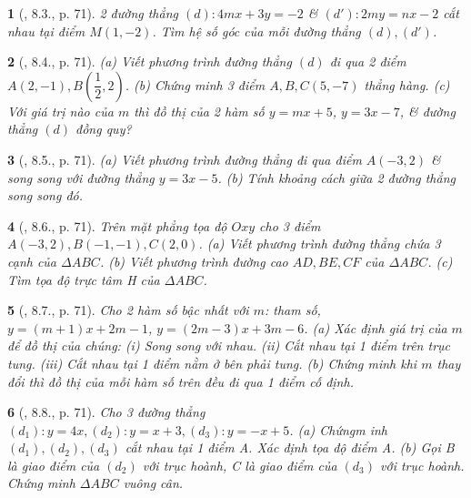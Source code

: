 \documentclass{article}
\newtheorem{baitoan}{}
\begin{document}
\begin{baitoan}[\cite{Binh_boi_duong_Toan_9_tap_1}, 8.3., p. 71]
	2 đường thẳng $(d):4mx + 3y = -2$ \& $(d'):2my = nx - 2$ cắt nhau tại điểm $M(1,-2)$. Tìm hệ số góc của mỗi đường thẳng $(d),(d')$.
\end{baitoan}

\begin{baitoan}[\cite{Binh_boi_duong_Toan_9_tap_1}, 8.4., p. 71]
	(a) Viết phương trình đường thẳng $(d)$ đi qua 2 điểm $A(2,-1),B\left(\dfrac{1}{2},2\right)$. (b) Chứng minh 3 điểm $A,B,C(5,-7)$ thẳng hàng. (c) Với giá trị nào của $m$ thì đồ thị của 2 hàm số $y = mx + 5$, $y = 3x - 7$, \& đường thẳng $(d)$ đồng quy?
\end{baitoan}

\begin{baitoan}[\cite{Binh_boi_duong_Toan_9_tap_1}, 8.5., p. 71]
	(a) Viết phương trình đường thẳng đi qua điểm $A(-3,2)$ \& song song với đường thẳng $y = 3x - 5$. (b) Tính khoảng cách giữa 2 đường thẳng song song đó.
\end{baitoan}

\begin{baitoan}[\cite{Binh_boi_duong_Toan_9_tap_1}, 8.6., p. 71]
	Trên mặt phẳng tọa độ $Oxy$ cho 3 điểm $A(-3,2),B(-1,-1),C(2,0)$. (a) Viết phương trình đường thẳng chứa 3 cạnh của $\Delta ABC$. (b) Viết phương trình đường cao $AD,BE,CF$ của $\Delta ABC$. (c) Tìm tọa độ trực tâm H của $\Delta ABC$.
\end{baitoan}

\begin{baitoan}[\cite{Binh_boi_duong_Toan_9_tap_1}, 8.7., p. 71]
	Cho 2 hàm số bậc nhất với $m$: tham số, $y = (m + 1)x + 2m - 1$, $y = (2m - 3)x + 3m - 6$. (a) Xác định giá trị của $m$ để đồ thị của chúng: (i) Song song với nhau. (ii) Cắt nhau tại 1 điểm trên trục tung. (iii) Cắt nhau tại 1 điểm nằm ở bên phải tung. (b) Chứng minh khi $m$ thay đổi thì đồ thị của mỗi hàm số trên đều đi qua 1 điểm cố định.
\end{baitoan}

\begin{baitoan}[\cite{Binh_boi_duong_Toan_9_tap_1}, 8.8., p. 71]
	Cho 3 đường thẳng $(d_1):y = 4x,(d_2):y = x + 3,(d_3):y = -x + 5$. (a) Chứngm inh $(d_1),(d_2),(d_3)$ cắt nhau tại 1 điểm A. Xác định tọa độ điểm A. (b) Gọi B là giao điểm của $(d_2)$ với trục hoành, C là giao điểm của $(d_3)$ với trục hoành. Chứng minh $\Delta ABC$ vuông cân.
\end{baitoan}
\end{document}
